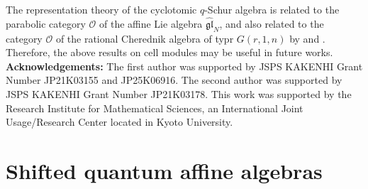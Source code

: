 \documentclass[12pt]{amsart}
\numberwithin{equation}{thm}
\newcommand\cO{\mathcal{O}}
\newcommand\wh{\widehat}
\newcommand\Fgl{\mathfrak{gl}}
\newcounter{ni}
\newcounter{go}
\begin{document}
The representation theory of the cyclotomic $q$-Schur algebra is related to the parabolic category $\cO$ of 
the affine Lie algebra $\wh{\Fgl}_N$, and also related to the category $\cO$ of the rational Cherednik algebra of typr $G(r,1,n)$ 
by \cite{RSVV16} and \cite{Los16}. 
Therefore, the above results on cell modules may be useful in future works. 
\\

{\bf Acknowledgements:} 
The first author was supported by JSPS KAKENHI Grant Number JP21K03155 and JP25K06916. 
The second author was supported by JSPS KAKENHI Grant Number JP21K03178. 
This work was supported by the Research Institute for Mathematical Sciences, 
an International Joint Usage/Research Center located in Kyoto University.



\section{Shifted quantum affine algebras} 
\end{document}
